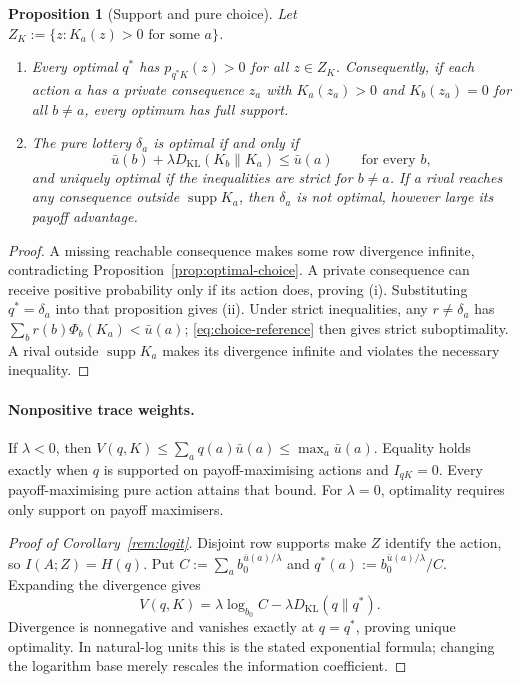 \documentclass[11pt,a4paper]{article}
\newtheorem{proposition}[theorem]{Proposition}
\theoremstyle{definition}
\newcommand{\Sh}{H}
\newcommand{\supp}{\operatorname{supp}}
\newcommand{\KL}{D_{\mathrm{KL}}}
\newcommand{\1}{\mathbf 1}
\begin{document}
\begin{samepage}
\begin{proposition}[Support and pure choice]\label{cor:support-pure}
Let $Z_K:=\{z:K_a(z)>0\text{ for some }a\}$.
\begin{enumerate}[label=\textup{(\roman*)},leftmargin=*]
\item Every optimal $q^*$ has $p_{q^*K}(z)>0$ for all $z\in Z_K$.
Consequently, if each action $a$ has a private consequence $z_a$ with
$K_a(z_a)>0$ and $K_b(z_a)=0$ for all $b\ne a$, every optimum has full
support.
\item The pure lottery $\delta_a$ is optimal if and only if
\[
\bar u(b)+\lambda\KL(K_b\|K_a)\le\bar u(a)
\qquad\text{for every }b,
\]
and uniquely optimal if the inequalities are strict for $b\ne a$.
If a rival reaches any consequence outside $\supp K_a$, then $\delta_a$
is not optimal, however large its payoff advantage.
\end{enumerate}
\end{proposition}
\end{samepage}

\begin{proof}
A missing reachable consequence makes some row divergence infinite,
contradicting Proposition~\ref{prop:optimal-choice}.  A private consequence
can receive positive probability only if its action does, proving
\textup{(i)}.  Substituting $q^*=\delta_a$ into that proposition gives
\textup{(ii)}.  Under strict inequalities, any $r\ne\delta_a$ has
$\sum_b r(b)\Phi_b(K_a)<\bar u(a)$; \eqref{eq:choice-reference} then
gives strict suboptimality.  A rival outside $\supp K_a$ makes its
divergence infinite and violates the necessary inequality.
\end{proof}

\paragraph{Nonpositive trace weights.}
If $\lambda<0$, then
$V(q,K)\le\sum_aq(a)\bar u(a)\le\max_a\bar u(a)$.
Equality holds exactly when $q$ is supported on payoff-maximising actions
and $I_{qK}=0$.  Every payoff-maximising pure action attains that bound.
For $\lambda=0$, optimality requires only support on payoff maximisers.

\begin{proof}[Proof of Corollary~\ref{rem:logit}]
Disjoint row supports make $Z$ identify the action, so $I(A;Z)=\Sh(q)$.
Put $C:=\sum_a b_0^{\bar u(a)/\lambda}$ and
$q^*(a):=b_0^{\bar u(a)/\lambda}/C$.  Expanding the divergence gives
\[
 V(q,K)=\lambda\log_{b_0}C-\lambda\KL(q\|q^*).
\]
Divergence is nonnegative and vanishes exactly at $q=q^*$, proving unique
optimality.  In natural-log units this is the stated exponential formula;
changing the logarithm base merely rescales the information coefficient.
\end{proof}
\end{document}
